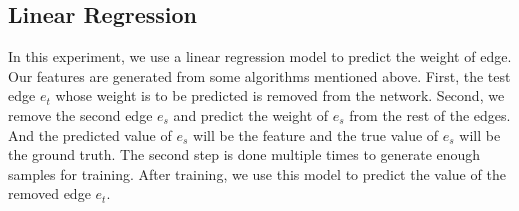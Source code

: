 
\subsection{Linear Regression}

In this experiment, we use a linear regression model to predict the weight of edge. Our features are generated from some algorithms mentioned above. First, the test edge $e_t$ whose weight is to be predicted is removed from the network. Second, we remove the second edge $e_s$ and predict the weight of $e_s$ from the rest of the edges. And the predicted value of $e_s$ will be the feature and the true value of $e_s$ will be the ground truth. The second step is done multiple times to generate enough samples for training. After training, we use this model to predict the value of the removed edge $e_t$.